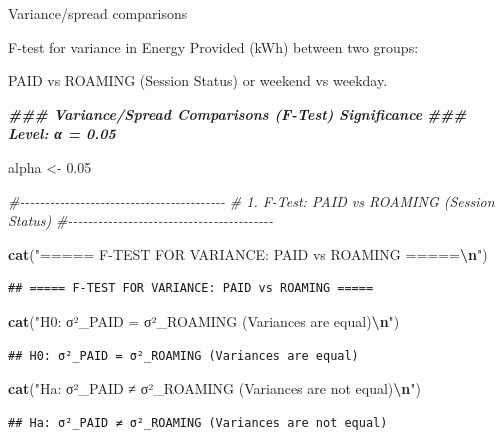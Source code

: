 \documentclass[
  12pt,
]{article}
\newenvironment{Shaded}{\begin{snugshade}}{\end{snugshade}}
\newcommand{\CommentTok}[1]{\textcolor[rgb]{0.56,0.35,0.01}{\textit{#1}}}
\newcommand{\DocumentationTok}[1]{\textcolor[rgb]{0.56,0.35,0.01}{\textbf{\textit{#1}}}}
\newcommand{\FloatTok}[1]{\textcolor[rgb]{0.00,0.00,0.81}{#1}}
\newcommand{\FunctionTok}[1]{\textcolor[rgb]{0.13,0.29,0.53}{\textbf{#1}}}
\newcommand{\NormalTok}[1]{#1}
\newcommand{\OtherTok}[1]{\textcolor[rgb]{0.56,0.35,0.01}{#1}}
\newcommand{\SpecialCharTok}[1]{\textcolor[rgb]{0.81,0.36,0.00}{\textbf{#1}}}
\newcommand{\StringTok}[1]{\textcolor[rgb]{0.31,0.60,0.02}{#1}}
\begin{document}
Variance/spread comparisons

F-test for variance in Energy Provided (kWh) between two groups:

PAID vs ROAMING (Session Status) or weekend vs weekday.

\begin{Shaded}
\begin{Highlighting}[]
\DocumentationTok{\#\#\# Variance/Spread Comparisons (F{-}Test) Significance}
\DocumentationTok{\#\#\# Level: α = 0.05}

\NormalTok{alpha }\OtherTok{\textless{}{-}} \FloatTok{0.05}

\CommentTok{\#{-}{-}{-}{-}{-}{-}{-}{-}{-}{-}{-}{-}{-}{-}{-}{-}{-}{-}{-}{-}{-}{-}{-}{-}{-}{-}{-}{-}{-}{-}{-}{-}{-}{-}{-}{-}{-}{-}{-}{-}{-}}
\CommentTok{\# 1. F{-}Test: PAID vs ROAMING (Session Status)}
\CommentTok{\#{-}{-}{-}{-}{-}{-}{-}{-}{-}{-}{-}{-}{-}{-}{-}{-}{-}{-}{-}{-}{-}{-}{-}{-}{-}{-}{-}{-}{-}{-}{-}{-}{-}{-}{-}{-}{-}{-}{-}{-}{-}}

\FunctionTok{cat}\NormalTok{(}\StringTok{"===== F{-}TEST FOR VARIANCE: PAID vs ROAMING =====}\SpecialCharTok{\textbackslash{}n}\StringTok{"}\NormalTok{)}
\end{Highlighting}
\end{Shaded}

\begin{verbatim}
## ===== F-TEST FOR VARIANCE: PAID vs ROAMING =====
\end{verbatim}

\begin{Shaded}
\begin{Highlighting}[]
\FunctionTok{cat}\NormalTok{(}\StringTok{"H0: σ²\_PAID = σ²\_ROAMING (Variances are equal)}\SpecialCharTok{\textbackslash{}n}\StringTok{"}\NormalTok{)}
\end{Highlighting}
\end{Shaded}

\begin{verbatim}
## H0: σ²_PAID = σ²_ROAMING (Variances are equal)
\end{verbatim}

\begin{Shaded}
\begin{Highlighting}[]
\FunctionTok{cat}\NormalTok{(}\StringTok{"Ha: σ²\_PAID ≠ σ²\_ROAMING (Variances are not equal)}\SpecialCharTok{\textbackslash{}n}\StringTok{"}\NormalTok{)}
\end{Highlighting}
\end{Shaded}

\begin{verbatim}
## Ha: σ²_PAID ≠ σ²_ROAMING (Variances are not equal)
\end{verbatim}
\end{document}
